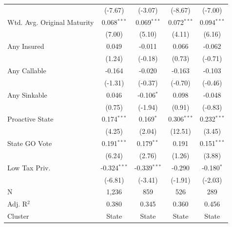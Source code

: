 \begin{tabular*}{\textwidth}{@{\extracolsep{\fill}}lcccc}
                               & (-7.67)               & (-3.07)                      & (-8.67)                      & (-7.00)\\   
   Wtd. Avg. Original Maturity & 0.068$^{***}$          & 0.069$^{***}$                 & 0.072$^{***}$                 & 0.094$^{***}$\\   
                               & (7.00)                & (5.10)                       & (4.11)                       & (6.16)\\   
   Any Insured                 & 0.049                  & -0.011                        & 0.066                         & -0.062\\   
                               & (1.24)                & (-0.18)                      & (0.73)                       & (-0.71)\\   
   Any Callable                & -0.164                 & -0.020                        & -0.163                        & -0.103\\   
                               & (-1.31)               & (-0.37)                      & (-0.70)                      & (-0.46)\\   
   Any Sinkable                & 0.046                  & -0.106$^{*}$                  & 0.098                         & -0.048\\   
                               & (0.75)                & (-1.94)                      & (0.91)                       & (-0.83)\\   
   Proactive State             & 0.174$^{***}$          & 0.169$^{*}$                   & 0.306$^{***}$                 & 0.232$^{***}$\\   
                               & (4.25)                & (2.04)                       & (12.51)                      & (3.45)\\   
   State GO Vote               & 0.191$^{***}$          & 0.179$^{**}$                  & 0.191                         & 0.151$^{***}$\\   
                               & (6.24)                & (2.76)                       & (1.26)                       & (3.88)\\   
   Low Tax Priv.               & -0.324$^{***}$         & -0.339$^{***}$                & -0.290                        & -0.180$^{*}$\\   
                               & (-6.81)               & (-3.41)                      & (-1.91)                      & (-2.03)\\   
   \hline
   N                & 1,236                  & 859                           & 526                           & 289\\  
   Adj. R$^2$              & 0.380                  & 0.345                         & 0.360                         & 0.456\\  
   Cluster              & State & State & State & State\\  
   \bottomrule
\end{tabular*}
\par\endgroup
